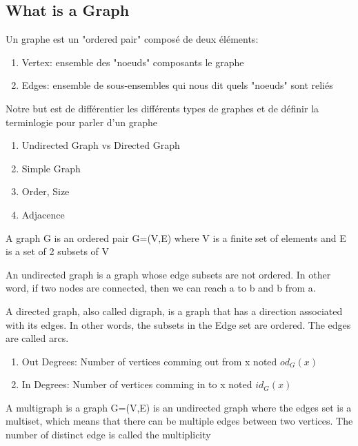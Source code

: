 \documentclass{article}
\begin{document}
\subsection{What is a Graph}%
\label{sub:What is a Graph}

Un graphe est un "ordered pair" composé de deux éléments:
\begin{enumerate}
    \item Vertex: ensemble des "noeuds" composants le graphe
    \item Edges: ensemble de sous-ensembles qui nous dit quels "noeuds"
	sont reliés
\end{enumerate}

Notre but est de différentier les différents types de graphes et de
définir la terminlogie pour parler d'un graphe
\begin{enumerate}
    \item Undirected Graph vs Directed Graph
    \item Simple Graph
    \item Order, Size
    \item Adjacence
\end{enumerate}

\begin{definition}[Graph]
    A graph G is an ordered pair G=(V,E) where V is a finite set of
    elements and E is a set of 2 subsets of V
\end{definition}

\begin{definition}
    An undirected graph is a graph whose edge subsets are not ordered.
    In other word, if two nodes are connected, then we can reach a to b
    and b from a.
\end{definition}

\begin{definition}
    A directed graph, also called digraph, is a graph that has a
    direction associated with its edges. In other words, the subsets
    in the Edge set are ordered. The edges are called arcs.
    \begin{enumerate}
        \item Out Degrees: Number of vertices comming out from x noted
	    $ od_G(x)$
	\item In Degrees: Number of vertices comming in to x noted
	    $id_G(x)$
    \end{enumerate}
\end{definition}

\begin{definition}
    A multigraph is a graph G=(V,E) is an undirected graph where the
    edges set is a multiset, which means that there can be multiple edges
    between two vertices. The number of distinct edge is called the
    multiplicity
\end{definition}
\end{document}
